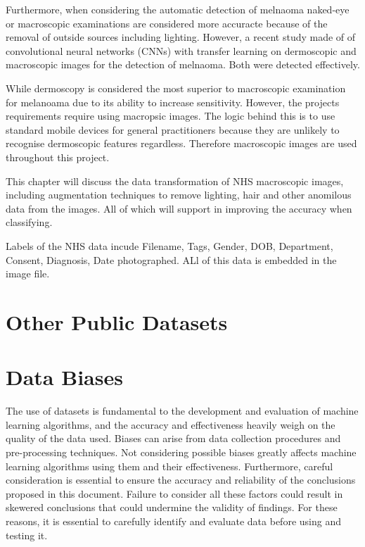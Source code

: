 Furthermore, when considering the automatic detection of melnaoma naked-eye or macroscopic examinations are considered more accuracte because of the removal of outside sources including lighting. However, a recent study made of of convolutional neural networks (CNNs) with transfer learning on dermoscopic and macroscopic images for the detection of melnaoma\cite{Millenia et al., 2022}. Both were detected effectively.

While dermoscopy is considered the most superior to macroscopic examination for melanoama due to its ability to increase sensitivity. However, the projects requirements require using macropsic images. The logic behind this is to use standard mobile devices for general practitioners because they are unlikely to recognise dermoscopic features regardless. Therefore macroscopic images are used throughout this project.

This chapter will discuss the data transformation of NHS macroscopic images, including augmentation techniques to remove lighting, hair and other anomilous data from the images. All of which will support in improving the accuracy when classifying.


Labels of the NHS data incude Filename, Tags, Gender, DOB, Department, Consent, Diagnosis, Date photographed. ALl of this data is embedded in the image file.

\section{Other Public Datasets}


\section{Data Biases}
The use of datasets is fundamental to the development and evaluation of machine learning algorithms, and the accuracy and effectiveness heavily weigh on the quality of the data used. Biases can arise from data collection procedures and pre-processing techniques. Not considering possible biases greatly affects machine learning algorithms using them and their effectiveness. Furthermore, careful consideration is essential to ensure the accuracy and reliability of the conclusions proposed in this document. Failure to consider all these factors could result in skewered conclusions that could undermine the validity of findings. For these reasons, it is essential to carefully identify and evaluate data before using and testing it.

